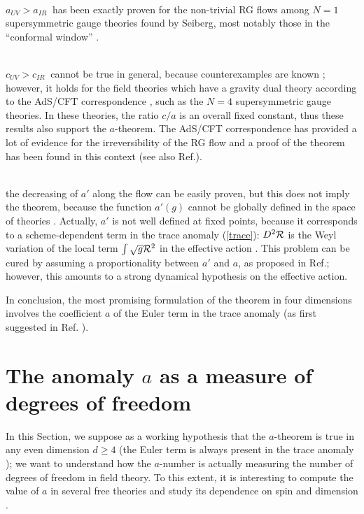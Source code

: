 \documentclass[proceedings]{JHEP}
\begin{document}
\medskip
{} \\
$a_{UV} > a_{IR}\ $ has been exactly proven \cite{afgj}
for the non-trivial RG flows among $N=1$ 
supersymmetric gauge theories found by Seiberg, most notably those
in the ``conformal window'' \cite{c-berg}. 

\medskip
{} \\
$c_{UV} > c_{IR}\ $ cannot be true in general, because 
counterexamples are known \cite{cfl}\cite{afgj}; however, it holds for
the field theories which have a gravity dual theory
according to the AdS/CFT correspondence \cite{hs}\cite{fgpw},
such as the $N=4$ supersymmetric gauge theories.
In these theories, the ratio $c/ a$ is an overall 
fixed constant, thus these results also support
the $a$-theorem. 
The AdS/CFT correspondence has provided a lot of evidence 
for the irreversibility of the RG flow and a proof
of the theorem has been found in this context \cite{fgpw}
(see also Ref.\cite{c-a}).

\medskip
{} \\
the decreasing of $a'$ along the flow can be easily
proven, but this does not imply the theorem,
because the function $a'(g)$ cannot be globally defined 
in the space of theories \cite{clv}.
Actually, $a'$ is not well defined at fixed points, 
because it corresponds to a scheme-dependent term in the trace
anomaly (\ref{trace}): $D^2 {\cal R}$ is the Weyl 
variation of the local term $\int\sqrt{g}{\cal R}^2$
in the effective action \cite{pbb}.
This problem can be cured by assuming a proportionality
between $a'$ and $a$, as proposed in Ref.\cite{ath};
however, this amounts to a 
strong dynamical hypothesis on the effective action.


In conclusion, the most promising formulation of the
theorem in four dimensions involves the coefficient $a$ of the 
Euler term in the trace anomaly 
(as first suggested in Ref. \cite{cardy}).




\section{The anomaly $a$ as a measure of degrees of freedom}

In this Section, we suppose as a working hypothesis
that the $a$-theorem is true in any even dimension
$d \ge 4$ (the Euler term is always present in the trace
anomaly \cite{ds}); we want to understand
how the $a$-number is actually measuring the
number of degrees of freedom in field theory.
To this extent, it is interesting to compute the
value of $a$ in several free theories and study its
dependence on spin and dimension \cite{ad}.
\end{document}
